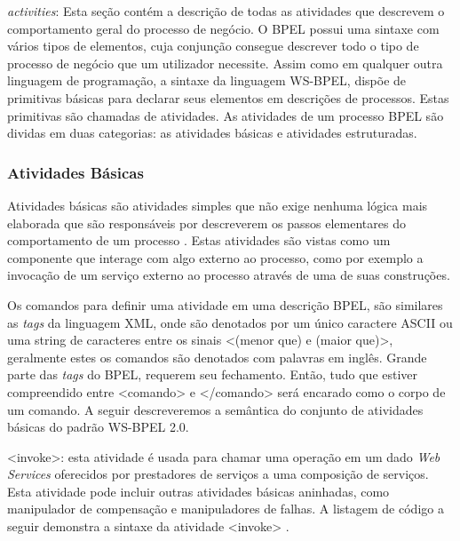 


\textit{activities}: Esta seção contém a descrição de todas as atividades que descrevem o comportamento geral do processo de negócio. O BPEL possui uma sintaxe com vários tipos de elementos, cuja conjunção consegue descrever todo o tipo de processo de negócio que um utilizador necessite. Assim como em qualquer outra linguagem de programação, a sintaxe da linguagem WS-BPEL, dispõe de primitivas básicas para declarar seus elementos em descrições de processos. Estas primitivas são chamadas de atividades\cite{BPEL20}. As atividades de um processo BPEL são dividas em duas categorias: as atividades básicas e atividades estruturadas. 

\subsubsection{Atividades Básicas}

Atividades básicas são atividades simples que não exige nenhuma lógica mais elaborada que são responsáveis por descreverem os passos elementares do comportamento de um processo \cite{BPEL20}. Estas atividades são vistas como um componente que interage com algo externo ao processo, como por exemplo a invocação de um serviço externo ao processo através de uma de suas construções. 

Os comandos para definir uma atividade em uma descrição BPEL, são similares as \textit{tags} da linguagem XML, onde são denotados por um único caractere ASCII ou uma string de caracteres entre os sinais <(menor que) e (maior que)>, geralmente estes os comandos são denotados com palavras em inglês. Grande parte das \textit{tags} do BPEL, requerem seu fechamento. Então, tudo que estiver compreendido entre <comando> e </comando> será encarado como o corpo de um comando. A seguir descreveremos a semântica do conjunto de atividades básicas do padrão WS-BPEL 2.0. 

<invoke>: esta atividade é usada para chamar uma operação em um dado \textit{Web Services} oferecidos por prestadores de serviços a uma composição de serviços. Esta atividade pode incluir outras atividades básicas aninhadas, como manipulador de compensação e manipuladores de falhas. A listagem de código a seguir demonstra a sintaxe da atividade <invoke> \cite{BPEL20}.

